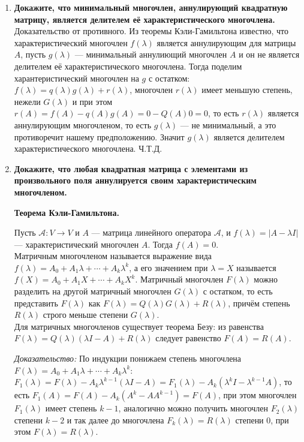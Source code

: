 \documentclass[12pt]{article} %
\begin{document}
\begin{enumerate}
    \item \textbf{Докажите, что минимальный многочлен, аннулирующий квадратную матрицу, является делителем её характеристического многочлена.}\\

    Доказательство от противного. Из теоремы Кэли-Гамильтона известно, что характеристический многочлен $f(\lambda)$ является аннулирующим для матрицы $A$, пусть $g(\lambda)$ --- минимальный аннулиющий многочлен $A$ и он не является делителем её характеристического многочлена. Тогда поделим харантеристический многочлен на $g$ с остатком: $f(\lambda) = q(\lambda)g(\lambda) + r(\lambda)$, многочлен $r(\lambda)$ имеет меньшую степень, нежели $G(\lambda)$ и при этом $r(A) = f(A) - q(A)g(A) = 0 - Q(A)0 = 0$, то есть $r(\lambda)$ является аннулирующим многочленом, то есть $g(\lambda)$ --- не минимальный, а это противоречит нашему предположению. Значит $g(\lambda)$ является делителем характеристического многочлена. Ч.Т.Д. 
    \item \textbf{Докажите, что любая квадратная матрица с элементами из произвольного поля аннулируется своим характеристическим многочленом.}

    \begin{center}
        \textbf{Теорема Кэли-Гамильтона.}
    \end{center}
    Пусть $\mathcal{A}: V \rightarrow V$ и $A$ --- матрица линейного оператора $\mathcal{A}$, и $f(\lambda) = |A - \lambda I|$ --- характеристический многочлен $A$. Тогда $f(A) = 0$.\\

    Матричным многочленом называется выражение вида $f(\lambda) = A_0 + A_1 \lambda + \cdots + A_k \lambda^k$, а его значением при $\lambda = X$ называется $f(X) = A_0 + A_1 X + \cdots + A_k X^k$. Матричный многочлен $F(\lambda)$ можно разделить на другой матричный многочлен $G(\lambda)$ с остатком, то есть представить $F(\lambda)$ как $F(\lambda) = Q(\lambda)G(\lambda) + R(\lambda)$, причём степень $R(\lambda)$ строго меньше степени $G(\lambda)$.\\

    Для матричных многочленов существует теорема Безу: из равенства $F(\lambda) = Q(\lambda)(\lambda I - A) + R(\lambda)$ следует равенство $F(A) = R(A)$.

    \textit{Доказательство: }По индукции понижаем степень многочлена $F(\lambda) =  A_0 + A_1 \lambda + \cdots + A_k \lambda^k$: $F_1(\lambda) = F(\lambda) - A_k\lambda^{k - 1}(\lambda I - A) = F_1(\lambda) - A_k(\lambda^k I - \lambda^{k - 1}A)$, то есть $F_1(A) = F(A) - A_k(A^k - AA^{k-1}) = F(A)$, при этом многочлен $F_1(\lambda)$ имеет степень $k - 1$, аналогично можно получить многочлен $F_2(\lambda)$ степени $k - 2$ и так далее до многочлена $F_k(\lambda) = R(\lambda)$ степени $0$, при этом $F(\lambda) = R(\lambda)$.\\


\end{enumerate}
\end{document}
